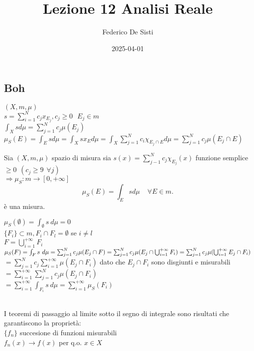 \documentclass[12px]{article}
\title{Lezione 12 Analisi Reale}
\date{2025-04-01}
\author{Federico De Sisti}
\begin{document}
	\maketitle
	\newpage
	\subsection{Boh}
	$(X,m,\mu)$\\
	$s = \sum^{N}_{i = 1}c_j x_{E_j}, c_j\geq 0 \ \ \ E_j\in m$\\
	$\int_X s d\mu = \sum^{N}_{j = 1}c_j \mu(E_j)$\\
	$\mu_S(E) = \int_E s d\mu = \int_X s x_E d\mu = \int_X \sum^{N}_{j= 1}c_i \chi_{E_j\cap E}d\mu = \sum^{N}_{j=1}c_j\mu(E_j\cap E)$ \\
	\begin{prop}
		Sia $(X,m,\mu)$ spazio di misura sia  $s(x) = \sum^{N}_{j-1}c_j\chi_{E_j}(x)$ funzione semplice $\geq 0 \ \ (c_j\geq 9 \ \ \forall j)$\\
		$ \Rightarrow  \mu_S: m \rightarrow [0,+\infty]$ \\
		\[
		\mu_S(E) = \int_E s d\mu\ \ \ \ \ \forall E\in m
		.\] 
		è una misura.
	\end{prop}
	\begin{dimo}
		$\mu_S(\emptyset) = \int_\emptyset s \ d\mu = 0$\\
		$\{F_i\}\subset m, F_i\cap F_l = \emptyset$  se  $i\neq l$\\
		 $F = \bigcup^{+\infty}_{i = 1}F_i$\\
		 $\mu_S (F) = \int_Fs \ d\mu = \sum^{N}_{j=1}c_j\mu(E_j\cap F) = \sum^{N}_{j = 1}c_j\mu(E_j\cap \bigcup^{+\infty}_{i=1}F_i) \\ = \sum^{N}_{j=1}c_j\mu( \bigcup^{+\infty}_{i=1}E_j\cap F_i)$\\
		 $ = \sum^{N}_{j=1}c_j \sum^{+\infty}_{i = 1}\mu(E_j\cap F_i)$ \hfill dato che $E_j\cap F_i$ sono disgiunti e misurabili\\
 $ = \sum^{+\infty}_{i = 1} \sum^{N}_{j=1}c_j\mu(E_j\cap F_i)$\\
 $ = \sum^{+\infty}_{i = 1}\int_{F_i} s \ d\mu = \sum^{+\infty}_{i = 1}\mu_S(F_i)$
	\end{dimo}
	\\[10px]
	I teoremi di passaggio al limite sotto il segno di integrale sono risultati che garantiscono la proprietà:\\
	$\{f_n\}$ succesione di funzioni misurabili\\
	$f_n(x) \rightarrow f(x)$ per q.o. $x\in X$\\
\end{document}
